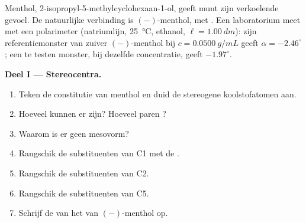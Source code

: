 \begin{problem}
\label{pb:b1:stereochemistry-in-depth:1}
Menthol, 2-isopropyl-5-methylcyclohexaan-1-ol, geeft munt zijn
verkoelende gevoel. De natuurlijke verbinding is $(-)$-menthol, met
 . Een laboratorium meet met een polarimeter
(natriumlijn, \qty{25}{\celsius}, ethanol, $\ell = \qty{1.00}{dm}$): zijn
referentiemonster van zuiver $(-)$-menthol bij $c = \qty{0.0500}{g/mL}$
geeft $\alpha =
-2.46^\circ$; een te testen monster, bij dezelfde concentratie, geeft
$-1.97^\circ$.

\medskip
\noindent\textbf{Deel I --- Stereocentra.}
\begin{enumerate}
  \item Teken de constitutie van menthol en duid de stereogene
        koolstofatomen aan.
  \item Hoeveel  kunnen er zijn? Hoeveel paren
        ?
  \item Waarom is er geen mesovorm?
  \item Rangschik de substituenten van C1 met de .
  \item Rangschik de substituenten van C2.
  \item Rangschik de substituenten van C5.
  \item Schrijf de  van het  van $(-)$-menthol op.
\end{enumerate}


\end{problem}
